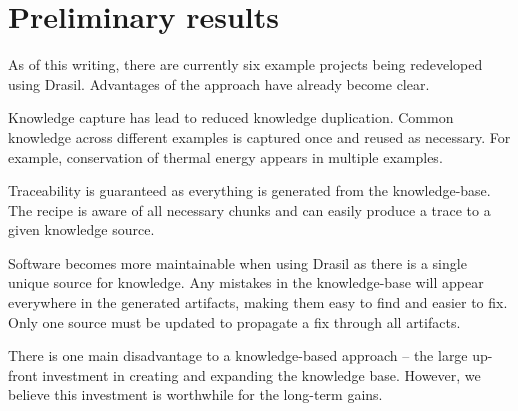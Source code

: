 \documentclass[twocolumn, 10pt]{article} %
\begin{document}
  
\section{Preliminary results}
As of this writing, there are currently six example projects being redeveloped
using Drasil. Advantages of the approach have already become clear.

Knowledge capture has lead to reduced knowledge duplication. Common knowledge
across different examples is captured once and reused as necessary. For example,
conservation of thermal energy appears in multiple examples.

Traceability is guaranteed as everything is generated from the knowledge-base.
The recipe is aware of all necessary chunks and can easily produce a trace to
a given knowledge source.

Software becomes more maintainable when using Drasil as there is a single unique
source for knowledge. Any mistakes in the knowledge-base will appear everywhere
in the generated artifacts, making them easy to find and easier to fix. Only one
source must be updated to propagate a fix through all artifacts.

There is one main disadvantage to a knowledge-based approach -- the large up-front
investment in creating and expanding the knowledge base. However, we believe this
investment is worthwhile for the long-term gains.

%
%
\end{document}
